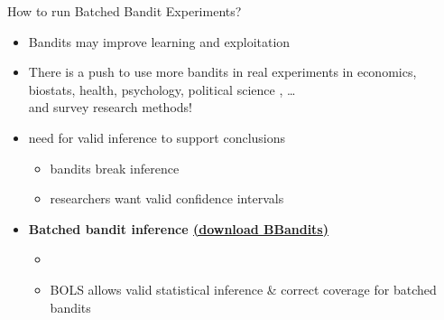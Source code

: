\documentclass[11pt,table]{beamer}
\begin{document}
\begin{frame}{How to run Batched Bandit Experiments?}


\begin{itemize}
    \item Bandits may improve learning and exploitation
    \item There is a push to use more bandits in real experiments in economics, biostats, health, psychology, political science \citep{Offer2021}, \ldots\\ and survey research methods!
    \item need for valid inference to support conclusions
    \begin{itemize}
        \item bandits break inference
        \item researchers want valid confidence intervals
    \end{itemize}
\item \textbf{\textcolor{BrewerRed}{Batched bandit} inference \href{https://rostam-afschar.de/bbandits/bbandits.htm}{(download BBandits)}} 
\begin{itemize}
		\item \citep{Kemper2025}
    \item BOLS allows valid statistical inference \& correct coverage for batched bandits
\end{itemize}
\end{itemize}
\end{frame}
\end{document}

